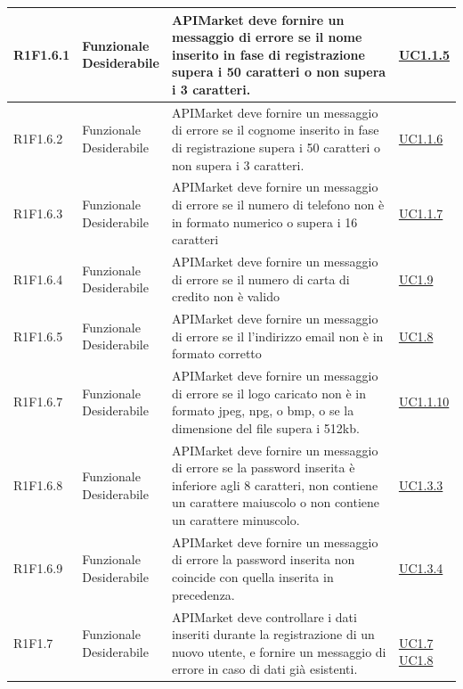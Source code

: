 \documentclass[12pt,a4paper,titlepage]{article}
\newcommand{\minitab}[2][1]{\begin{tabular}#1 #2\end{tabular}}
\newcommand{\uc}[1]{\hyperref[UC#1]{UC#1}}
\begin{document}
{\begin{longtable}{|m{5em}|m{6em}|m{28em}|m{5em}|}
			\hline
			R1F1.6.1 & \minitab[c]{Funzionale\\Desiderabile} & APIMarket deve fornire un messaggio di errore se il nome inserito in fase di registrazione supera i 50 caratteri o non supera i 3 caratteri. & \uc{1.1.5}\\
			\hline
			R1F1.6.2 & \minitab[c]{Funzionale\\Desiderabile} & APIMarket deve fornire un messaggio di errore se il cognome inserito in fase di registrazione supera i 50 caratteri o non supera i 3 caratteri. & \uc{1.1.6}\\
			\hline
			R1F1.6.3 & \minitab[c]{Funzionale\\Desiderabile} & APIMarket deve fornire un messaggio di errore se il numero di telefono non è in formato numerico o supera i 16 caratteri & \uc{1.1.7}\\
			\hline
			R1F1.6.4 & \minitab[c]{Funzionale\\Desiderabile} & APIMarket deve fornire un messaggio di errore se il numero di carta di credito non è valido & \uc{1.9}\\
			\hline
			R1F1.6.5 & \minitab[c]{Funzionale\\Desiderabile} & APIMarket deve fornire un messaggio di errore se il l'indirizzo email non è in formato corretto & \uc{1.8}\\
			\hline
			R1F1.6.7 & \minitab[c]{Funzionale\\Desiderabile} & APIMarket deve fornire un messaggio di errore se il logo caricato non è in formato jpeg, npg, o bmp, o se la dimensione del file supera i 512kb. & \uc{1.1.10}\\
			\hline
			R1F1.6.8 & \minitab[c]{Funzionale\\Desiderabile} & APIMarket deve fornire un messaggio di errore se la password inserita è inferiore agli 8 caratteri, non contiene un carattere maiuscolo o non contiene un carattere minuscolo. & \uc{1.3.3}\\
			\hline
			R1F1.6.9 & \minitab[c]{Funzionale\\Desiderabile} & APIMarket deve fornire un messaggio di errore la password inserita non coincide con quella inserita in precedenza. & \uc{1.3.4}\\
			\hline
			R1F1.7 & \minitab[c]{Funzionale\\Desiderabile} & APIMarket deve controllare i dati inseriti durante la registrazione di un nuovo utente, e fornire un messaggio di errore in caso di dati già esistenti. & \shortstack[l]{\\\uc{1.7}\\\uc{1.8}}\\

\end{longtable}}
\end{document}

